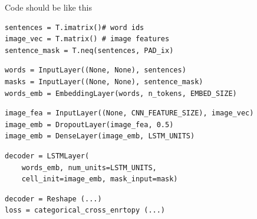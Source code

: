 \documentclass{beamer}
\begin{document}
\begin{frame}[fragile]{Code should be like this}
	 
\begin{verbatim}
sentences = T.imatrix()# word ids
image_vec = T.matrix() # image features
sentence_mask = T.neq(sentences, PAD_ix)
\end{verbatim}
 
\begin{verbatim}
words = InputLayer((None, None), sentences)
masks = InputLayer((None, None), sentence_mask)
words_emb = EmbeddingLayer(words, n_tokens, EMBED_SIZE)
\end{verbatim}
 
\begin{verbatim}
image_fea = InputLayer((None, CNN_FEATURE_SIZE), image_vec)
image_emb = DropoutLayer(image_fea, 0.5)
image_emb = DenseLayer(image_emb, LSTM_UNITS)
\end{verbatim}
 
\begin{verbatim}
decoder = LSTMLayer(
	words_emb, num_units=LSTM_UNITS,
	cell_init=image_emb, mask_input=mask)
\end{verbatim}
 
\begin{verbatim}
decoder = Reshape (...)
loss = categorical_cross_enrtopy (...)
\end{verbatim}
\end{frame}
\end{document}
